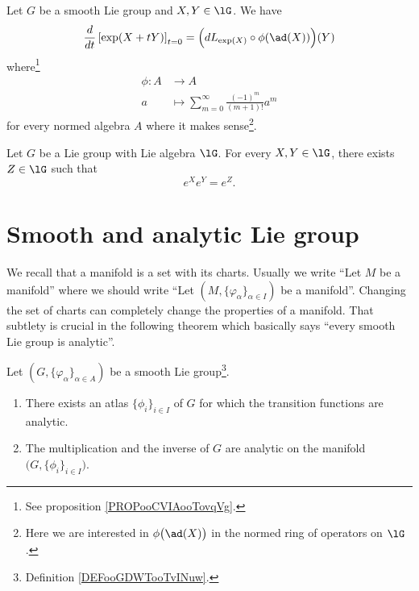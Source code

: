 \begin{lemma}	\label{LEMooTXNVooYmZDOl}
	Let \( G\) be a smooth Lie group and \( X,Y\in\lG\). We have
	\begin{equation}
		\frac{d}{dt} \left[ \exp(X+tY)  \right]_{t=0}=\Big( dL_{\exp(X)}\circ\phi(\ad(X)) \Big)(Y)
	\end{equation}
	where\footnote{See proposition \ref{PROPooCVIAooTovqVg}.}
	\begin{equation}
		\begin{aligned}
			\phi\colon A & \to A                                                   \\
			a            & \mapsto \sum_{m=0}^{\infty}\frac{ (-1)^m }{ (m+1)! }a^m
		\end{aligned}
	\end{equation}
	for every normed algebra \( A\) where it makes sense\footnote{Here we are interested in \( \phi\big(\ad(X)\big)\) in the normed ring of operators on \( \lG\).}.
\end{lemma}



\begin{theorem}     \label{THOooYJPEooSpKHnC}
	Let \( G\) be a Lie group with Lie algebra \( \lG\). For every \( X,Y\in \lG\), there exists \( Z\in \lG\) such that
	\begin{equation}
		e^{X} e^{Y}= e^{Z}.
	\end{equation}
\end{theorem}


\section{Smooth and analytic Lie group}

We recall that a manifold is a set with its charts. Usually we write ``Let \( M\) be a manifold'' where we should write ``Let \( (M,\{ \varphi_{\alpha} \}_{\alpha\in I})\) be a manifold''. Changing the set of charts can completely change the properties of a manifold. That subtlety is crucial in the following theorem which basically says ``every smooth Lie group is analytic''.
\begin{theorem}       \label{THOooSQVCooCyEPOS}
	Let \( (G,\{ \varphi_{\alpha} \}_{\alpha\in A})\) be a smooth Lie group\footnote{Definition \ref{DEFooGDWTooTvINuw}.}.
	\begin{enumerate}
		\item
		      There exists an atlas \( \{ \phi_i \}_{i\in I}\) of \( G\) for which the transition functions are analytic.
		\item
		      The multiplication and the inverse of \( G\) are analytic on the manifold \( \big( G,\{ \phi_i \}_{i\in I} \big)\).
	\end{enumerate}
\end{theorem}

